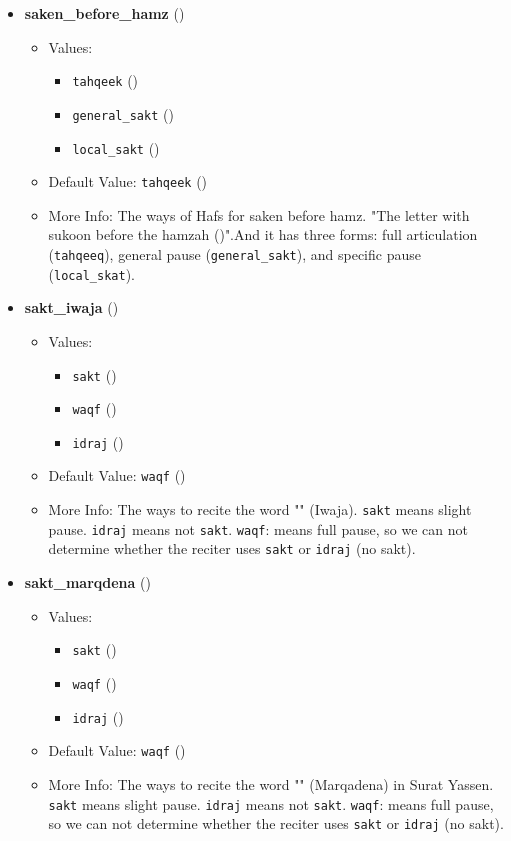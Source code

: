 \begin{itemize}
\item \textbf{saken\_before\_hamz} ()
  \begin{itemize}
  \item Values: 
    \begin{itemize}
    \item  \texttt{tahqeek} ()
    \item  \texttt{general\_sakt} ()
    \item  \texttt{local\_sakt} ()
    \end{itemize}
  \item Default Value: \texttt{tahqeek} ()
  \item More Info: The ways of Hafs for saken before hamz. "The letter with sukoon before the hamzah ()".And it has three forms: full articulation (\texttt{tahqeeq}), general pause (\texttt{general\_sakt}), and specific pause (\texttt{local\_skat}).
  \end{itemize}

\item \textbf{sakt\_iwaja} ()
  \begin{itemize}
  \item Values: 
    \begin{itemize}
    \item  \texttt{sakt} ()
    \item  \texttt{waqf} ()
    \item  \texttt{idraj} ()
    \end{itemize}
  \item Default Value: \texttt{waqf} ()
  \item More Info: The ways to recite the word "" (Iwaja). \texttt{sakt} means slight pause. \texttt{idraj} means not \texttt{sakt}. \texttt{waqf}: means full pause, so we can not determine whether the reciter uses \texttt{sakt} or \texttt{idraj} (no sakt).
  \end{itemize}

\item \textbf{sakt\_marqdena} ()
  \begin{itemize}
  \item Values: 
    \begin{itemize}
    \item  \texttt{sakt} ()
    \item  \texttt{waqf} ()
    \item  \texttt{idraj} ()
    \end{itemize}
  \item Default Value: \texttt{waqf} ()
  \item More Info: The ways to recite the word "" (Marqadena) in Surat Yassen. \texttt{sakt} means slight pause. \texttt{idraj} means not \texttt{sakt}. \texttt{waqf}: means full pause, so we can not determine whether the reciter uses \texttt{sakt} or \texttt{idraj} (no sakt).
  \end{itemize}


\end{itemize}
